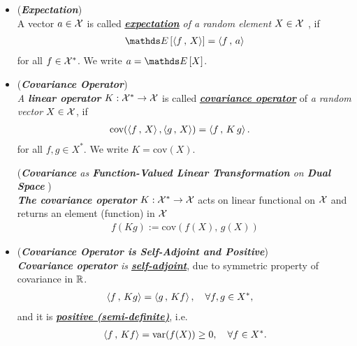\documentclass[11pt]{article}
\begin{document}
\begin{itemize}
\item \begin{definition} (\emph{\textbf{Expectation}})\\
A vector $a \in {\mathcal X}$ is called \emph{\underline{\textbf{expectation}} of a random element $X \in {\mathcal X}$} , if
\begin{align*}
\E{}{\inn{f}{X}} = \inn{f}{a}
\end{align*}
for all $f \in {\mathcal X}^{*}$.  We write $a = \E{}{X}$.
\end{definition}

\item \begin{definition} (\emph{\textbf{Covariance Operator}})\\
\emph{A \textbf{linear operator}} $K : {\mathcal X}^{*} \to  {\mathcal X}$ is called  \emph{\underline{\textbf{covariance operator}}} of \emph{a random vector} $X \in {\mathcal X}$, if
\begin{align*}
\text{cov}(\left\langle f\,,\, X \right\rangle, \left\langle g\,,\, X \right\rangle) &= \left\langle f\,,\, K\,g \right\rangle.
\end{align*}
for all $f, g \in X^{*}$. We write $K = \text{cov}(X)$.
\end{definition}

\begin{remark} (\emph{\textbf{Covariance} as \textbf{Function-Valued Linear Transformation} on \textbf{Dual Space} })\\
\emph{\textbf{The covariance operator}} $K: {\mathcal X}^{*} \to  {\mathcal X}$ acts on linear functional on ${\mathcal X}$ and returns an element (function) in ${\mathcal X}$
\begin{align*}
f(K g) :=  \text{cov}(f(X),\,g(X))  
\end{align*}
\end{remark}

\item \begin{remark} (\emph{\textbf{Covariance Operator is Self-Adjoint and Positive}})\\
\emph{\textbf{Covariance operator} is \underline{\textbf{self-adjoint}}}, due to symmetric property of covariance in ${\mathbb R}$.
\begin{align*}
\left\langle f\,,\, Kg \right\rangle &= \left\langle g\,,\, Kf \right\rangle, \quad \forall f, g \in X^{*},
\end{align*} and it is \underline{\emph{\textbf{positive (semi-definite)}}}, i.e.
\begin{align*}
\left\langle f\,,\, Kf \right\rangle = \text{var}(f(X)) \ge 0, \quad \forall f \in X^{*}.
\end{align*}
\end{remark}


\end{itemize}
\end{document}
